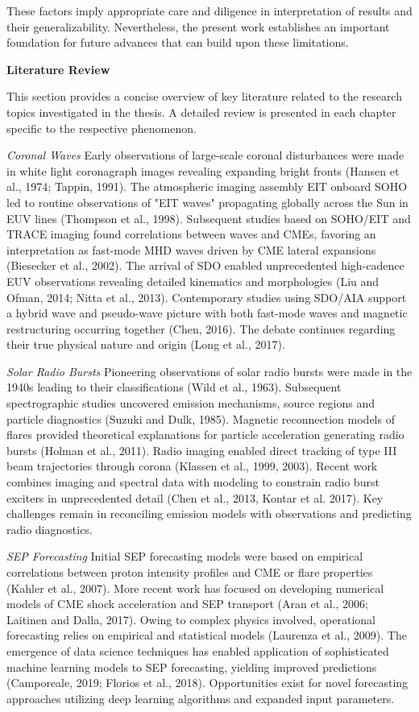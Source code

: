 \documentclass{article}
\begin{document}
These factors imply appropriate care and diligence in interpretation of results and their generalizability. Nevertheless, the present work establishes an important foundation for future advances that can build upon these limitations.


\textbf{Literature Review}

This section provides a concise overview of key literature related to the research topics investigated in the thesis. A detailed review is presented in each chapter specific to the respective phenomenon.

\textit{Coronal Waves}
Early observations of large-scale coronal disturbances were made in white light coronagraph images revealing expanding bright fronts (Hansen et al., 1974; Tappin, 1991). The atmospheric imaging assembly EIT onboard SOHO led to routine observations of "EIT waves" propagating globally across the Sun in EUV lines (Thompson et al., 1998). Subsequent studies based on SOHO/EIT and TRACE imaging found correlations between waves and CMEs, favoring an interpretation as fast-mode MHD waves driven by CME lateral expansions (Biesecker et al., 2002). The arrival of SDO enabled unprecedented high-cadence EUV observations revealing detailed kinematics and morphologies (Liu and Ofman, 2014; Nitta et al., 2013). Contemporary studies using SDO/AIA support a hybrid wave and pseudo-wave picture with both fast-mode waves and magnetic restructuring occurring together (Chen, 2016). The debate continues regarding their true physical nature and origin (Long et al., 2017).

\textit{Solar Radio Bursts}
Pioneering observations of solar radio bursts were made in the 1940s leading to their classifications (Wild et al., 1963). Subsequent spectrographic studies uncovered emission mechanisms, source regions and particle diagnostics (Suzuki and Dulk, 1985). Magnetic reconnection models of flares provided theoretical explanations for particle acceleration generating radio bursts (Holman et al., 2011). Radio imaging enabled direct tracking of type III beam trajectories through corona (Klassen et al., 1999, 2003). Recent work combines imaging and spectral data with modeling to constrain radio burst exciters in unprecedented detail (Chen et al., 2013, Kontar et al. 2017). Key challenges remain in reconciling emission models with observations and predicting radio diagnostics.

\textit{SEP Forecasting}
Initial SEP forecasting models were based on empirical correlations between proton intensity profiles and CME or flare properties (Kahler et al., 2007). More recent work has focused on developing numerical models of CME shock acceleration and SEP transport (Aran et al., 2006; Laitinen and Dalla, 2017). Owing to complex physics involved, operational forecasting relies on empirical and statistical models (Laurenza et al., 2009). The emergence of data science techniques has enabled application of sophisticated machine learning models to SEP forecasting, yielding improved predictions (Camporeale, 2019; Florios et al., 2018). Opportunities exist for novel forecasting approaches utilizing deep learning algorithms and expanded input parameters.
\end{document}
